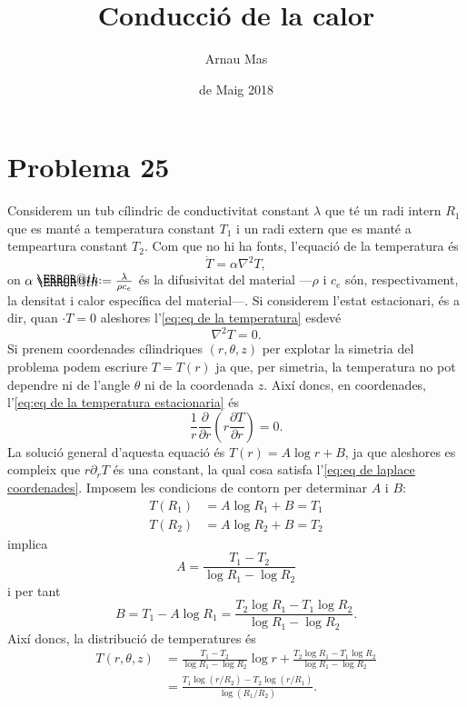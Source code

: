 \documentclass[12pt]{article}
\title{\sffamily {\bfseries Entrega 3:} Conducció de la calor}
\author{\sffamily Arnau Mas}
\date{\sffamily 4 de Maig 2018}
\makeatletter
\newcommand*{\defeq}{\mathrel{\rlap{%
    \raisebox{0.3ex}{$\m@th\cdot$}}%
  \raisebox{-0.3ex}{$\m@th\cdot$}}%
=}
\makeatother
\begin{document}
\maketitle

\section{Problema 25}
Considerem un tub cílindric de conductivitat constant \( \lambda \) que té un radi intern \( R_1 \) que es manté a temperatura constant \( T_1 \) i un radi extern que es manté a tempeartura constant \( T_2 \). Com que no hi ha fonts, l'equació de la temperatura és  
\begin{equation} \label{eq:eq de la temperatura}
	\dot{T} = \alpha \nabla^2 T,
\end{equation}
on \( \alpha \defeq \frac{\lambda}{\rho c_e} \) és la difusivitat del material ---\( \rho \) i \( c_e \) són, respectivament, la densitat i calor específica del material---. Si considerem l'estat estacionari, és a dir, quan \( \cdot{T} = 0 \) aleshores l'\cref{eq:eq de la temperatura} esdevé
\begin{equation} \label{eq:eq de la temperatura estacionaria}
	\nabla^2 T = 0. 
\end{equation}
Si prenem coordenades cílindriques \( (r, \theta, z) \) per explotar la simetria del problema podem escriure \( T = T(r) \) ja que, per simetria, la temperatura no pot dependre ni de l'angle \( \theta \) ni de la coordenada \( z \). Així doncs, en coordenades, l'\cref{eq:eq de la temperatura estacionaria} és
\begin{equation} \label{eq:eq de laplace coordenades}
	\frac{1}{r} \frac{\partial}{\partial r} \left( r \frac{\partial T}{\partial r} \right) = 0. 
\end{equation}
La solució general d'aquesta equació és \( T(r) = A\log{r} + B \), ja que aleshores es compleix que \( r \partial_rT \) és una constant, la qual cosa satisfa l'\cref{eq:eq de laplace coordenades}. Imposem les condicions de contorn per determinar \( A \) i \( B \):
\begin{align*}
	T(R_1) &= A\log{R_1} + B = T_1 \\
	T(R_2) &= A\log{R_2} + B = T_2 
\end{align*}
implica
\begin{equation*}
 	A = \frac{T_1 - T_2}{\log{R_1} - \log{R_2}} 
\end{equation*}
i per tant
\begin{equation*}
	B = T_1 - A\log{R_1} = \frac{T_2 \log{R_1} - T_1 \log{R_2}}{\log{R_1} - \log{R_2}}. 
\end{equation*}
Així doncs, la distribució de temperatures és
\begin{equation} \label{eq:distribucio de temperatura}
	\begin{aligned}
		T(r,\theta,z) & = \frac{T_1 - T_2}{\log{R_1} - \log{R_2}}\log{r} + \frac{T_2 \log{R_1} - T_1 \log{R_2}}{\log{R_1} - \log{R_2}} \\
									& = \frac{T_1 \log{(r/R_2)} - T_2 \log{(r/R_1)}}{\log{(R_1/R_2)}}.
	\end{aligned}
\end{equation}
\end{document}
